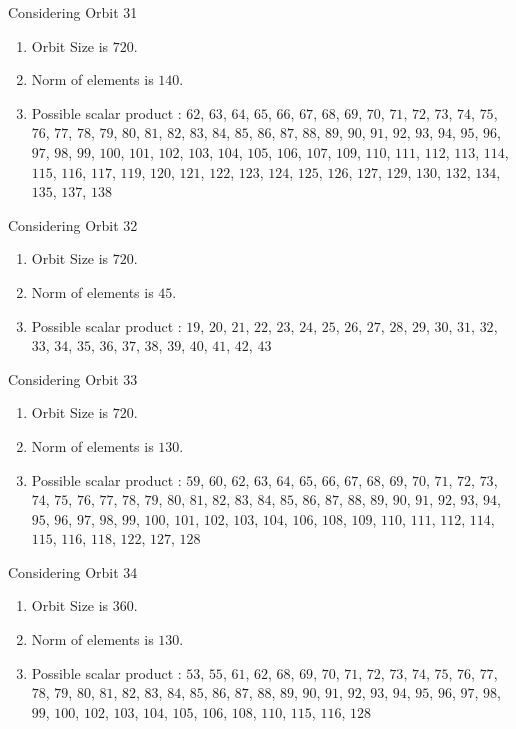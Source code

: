 \documentclass[12pt]{article}
\begin{document}
Considering Orbit 31
\begin{enumerate}
\item Orbit Size is $720$.
\item Norm of elements is $140$.
\item Possible scalar product : $62$, $63$, $64$, $65$, $66$, $67$, $68$, $69$, $70$, $71$, $72$, $73$, $74$, $75$, $76$, $77$, $78$, $79$, $80$, $81$, $82$, $83$, $84$, $85$, $86$, $87$, $88$, $89$, $90$, $91$, $92$, $93$, $94$, $95$, $96$, $97$, $98$, $99$, $100$, $101$, $102$, $103$, $104$, $105$, $106$, $107$, $109$, $110$, $111$, $112$, $113$, $114$, $115$, $116$, $117$, $119$, $120$, $121$, $122$, $123$, $124$, $125$, $126$, $127$, $129$, $130$, $132$, $134$, $135$, $137$, $138$
\end{enumerate}
Considering Orbit 32
\begin{enumerate}
\item Orbit Size is $720$.
\item Norm of elements is $45$.
\item Possible scalar product : $19$, $20$, $21$, $22$, $23$, $24$, $25$, $26$, $27$, $28$, $29$, $30$, $31$, $32$, $33$, $34$, $35$, $36$, $37$, $38$, $39$, $40$, $41$, $42$, $43$
\end{enumerate}
Considering Orbit 33
\begin{enumerate}
\item Orbit Size is $720$.
\item Norm of elements is $130$.
\item Possible scalar product : $59$, $60$, $62$, $63$, $64$, $65$, $66$, $67$, $68$, $69$, $70$, $71$, $72$, $73$, $74$, $75$, $76$, $77$, $78$, $79$, $80$, $81$, $82$, $83$, $84$, $85$, $86$, $87$, $88$, $89$, $90$, $91$, $92$, $93$, $94$, $95$, $96$, $97$, $98$, $99$, $100$, $101$, $102$, $103$, $104$, $106$, $108$, $109$, $110$, $111$, $112$, $114$, $115$, $116$, $118$, $122$, $127$, $128$
\end{enumerate}
Considering Orbit 34
\begin{enumerate}
\item Orbit Size is $360$.
\item Norm of elements is $130$.
\item Possible scalar product : $53$, $55$, $61$, $62$, $68$, $69$, $70$, $71$, $72$, $73$, $74$, $75$, $76$, $77$, $78$, $79$, $80$, $81$, $82$, $83$, $84$, $85$, $86$, $87$, $88$, $89$, $90$, $91$, $92$, $93$, $94$, $95$, $96$, $97$, $98$, $99$, $100$, $102$, $103$, $104$, $105$, $106$, $108$, $110$, $115$, $116$, $128$
\end{enumerate}
\end{document}
